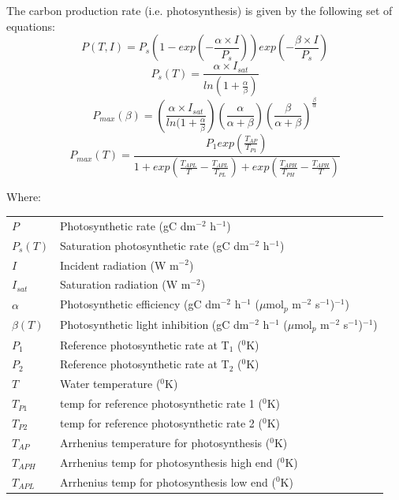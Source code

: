 \documentclass{deltares_manual}
\begin{document}
The carbon production rate (i.e. photosynthesis) is given by the following set of equations:
\begin{equation}
P(T,I) = P_s(1-exp(-\frac{\alpha \times I}{P_s}))exp(-\frac{\beta \times I}{P_s})
\end{equation}
\begin{equation}
P_s(T) = \frac{\alpha \times I_{sat}}{ln(1+\frac{\alpha}{\beta})}
\end{equation}
\begin{equation}
P_{max}(\beta) = (\frac{\alpha \times I_{sat}}{ln(1+\frac{\alpha}{\beta}})(\frac{\alpha}{\alpha+\beta})(\frac{\beta}{\alpha+\beta})^{\frac{\beta}{\alpha}}
\end{equation}
\begin{equation}
P_{max}(T) = \frac{P_1exp(\frac{T_{AP}}{T_{P1}})}{1+exp(\frac{T_{APL}}{T} - \frac{T_{APL}}{T_{PL}})+exp(\frac{T_{APH}}{T_{PH}}-\frac{T_{APH}}{T})}
\end{equation}

Where:\\

\begin{tabular}{ll}
$P$ & Photosynthetic rate (gC dm$^{-2}$ h$^{-1}$)\\
$P_s(T)$ & Saturation photosynthetic rate (gC dm$^{-2}$ h$^{-1}$)\\
$I$ & Incident radiation (W m$^{-2}$)\\
$I_{sat}$ & Saturation radiation (W m$^{-2}$)\\
$\alpha$ & Photosynthetic efficiency (gC dm$^{-2}$ h$^{-1}$ ($\mu$mol$_{p}$ m$^{-2}$ s$^{-1}$)$^{-1}$) \\
$\beta(T)$ & Photosynthetic light inhibition (gC dm$^{-2}$ h$^{-1}$ ($\mu$mol$_{p}$ m$^{-2}$ s$^{-1}$)$^{-1}$) \\
$P_1$ & Reference photosynthetic rate at T$_1$ ($^{0}$K)\\
$P_2$ & Reference photosynthetic rate at T$_2$ ($^{0}$K)\\
$T$ & Water temperature ($^{0}$K)\\
$T_{P1}$ & temp for reference photosynthetic rate 1 ($^{0}$K)\\
$T_{P2}$ & temp for reference photosynthetic rate 2	($^{0}$K)\\
$T_{AP}$ & Arrhenius temperature for photosynthesis ($^{0}$K)\\
$T_{APH}$ & Arrhenius temp for photosynthesis high end ($^{0}$K)\\
$T_{APL}$ & Arrhenius temp for photosynthesis low end ($^{0}$K)\\
\end{tabular}
\end{document}
